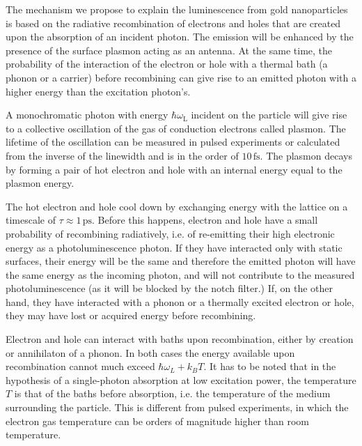 \documentclass[journal=nalefd,manuscript=letter]{achemso}
\newcommand{\fs}{\ensuremath{\,\textrm{fs}}}
\newcommand{\ps}{\ensuremath{\,\textrm{ps}}}
\begin{document}
The mechanism we propose to explain the luminescence from gold nanoparticles is
based on the radiative recombination of electrons and holes that are created
upon the absorption of an incident photon\cite{Dulkeith2004,Mooradian1969}. The
emission will be enhanced by the presence of the surface plasmon acting as an
antenna\cite{Mohamed2000}. At the same time, the probability of the interaction
of the electron or hole with a thermal bath (a phonon or a carrier) before
recombining can give rise to an emitted photon with a higher energy than the
excitation photon's\cite{Hodak2000,Giri2015,Arbouet2003a}.

A monochromatic photon with energy $\hbar\omega_\textrm{L}$ incident on the
particle will give rise to a collective oscillation of the gas of conduction
electrons called plasmon. The lifetime of the oscillation can be measured in
pulsed experiments or calculated from the inverse of the linewidth and is in the
order of $10\fs$\cite{Sonnichsen2002}. The plasmon decays by forming a pair of
hot electron and hole with an internal energy equal to the plasmon
energy\cite{Sundararaman2014,Brongersma2015,AlejandroManjavacasJunG.LiuVikramKulkarni2014}.

The hot electron and hole cool down by exchanging energy with the lattice on a
timescale of $\tau\approx1\ps$\cite{Pustovalov2005}. Before this happens,
electron and hole have a small probability of recombining radiatively, i.e. of 
re-emitting their high electronic energy as a photoluminescence photon. If they
have interacted only with static surfaces, their energy will be the same and
therefore the emitted photon will have the same energy as the incoming
photon, and will not contribute to the measured photoluminescence (as it will be
blocked by the notch filter.) If, on the other hand, they have interacted with a
phonon or a thermally excited electron or hole, they may have lost or acquired
energy before recombining.

Electron and hole can interact with baths upon recombination, either by
creation or annihilaton of a phonon. In both cases the energy available upon
recombination cannot much exceed $\hbar\omega_L+k_BT$. It has to be noted that
in the hypothesis of a single-photon absorption at low excitation power, the
temperature $T$ is that of the baths before absorption, i.e. the temperature of
the medium surrounding the particle. This is different from pulsed experiments,
in which the electron gas temperature can be orders of magnitude higher than
room temperature\cite{Baffou2013a}. 
\end{document}
